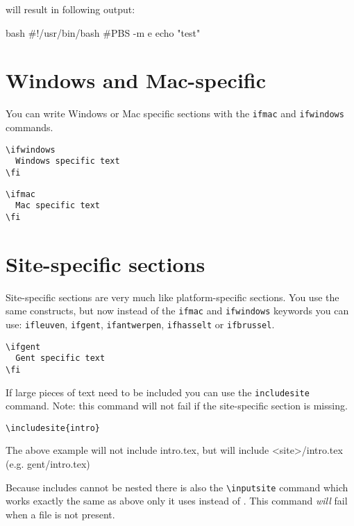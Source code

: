 \documentclass[11pt,a4paper]{article}
\begin{document}
will result in following output:

\begin{code}{bash}
#!/usr/bin/bash
#PBS -m e
echo "test"
\end{code}

\section{Windows and Mac-specific}
\label{sec:windows-and-mac-specific}

You can write Windows or Mac specific sections with the \texttt{ifmac} and
\texttt{ifwindows} commands.

\begin{verbatim}
\ifwindows
  Windows specific text
\fi
\end{verbatim}

\begin{verbatim}
\ifmac
  Mac specific text
\fi
\end{verbatim}


\section{Site-specific sections}
\label{sec:site-specific-sections}

Site-specific sections are very much like platform-specific sections. You use
the same constructs, but now instead of the \texttt{ifmac} and \texttt{ifwindows}
keywords you can use: \texttt{ifleuven}, \texttt{ifgent}, \texttt{ifantwerpen},
\texttt{ifhasselt} or \texttt{ifbrussel}.

\begin{verbatim}
\ifgent
  Gent specific text
\fi
\end{verbatim}

If large pieces of text need to be included you can use the
\verb|includesite| command.
Note: this command will not fail if the site-specific section is missing.

\begin{verbatim}
\includesite{intro}
\end{verbatim}

The above example will not include intro.tex, but will include <site>/intro.tex (e.g. gent/intro.tex)

Because includes cannot be nested there is also the \verb|\inputsite| command
which works exactly the same as above only it uses \verb|| instead of
\verb||. This command \emph{will} fail when a file is not present.
\end{document}
